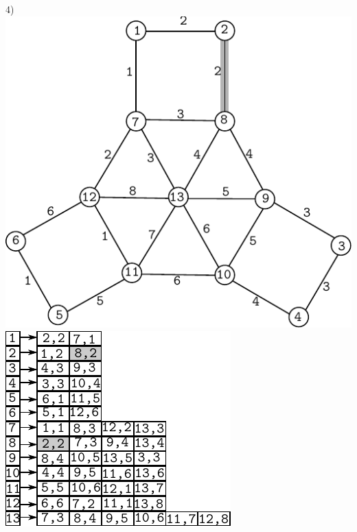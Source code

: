 \documentclass{article}
\begin{document}
\begin{center}
4)\includegraphics[scale=0.6]{bottleneck/g4}
\hspace{5mm}
\includegraphics[scale=0.9]{bottleneck/l4}
\end{center}
\end{document}
